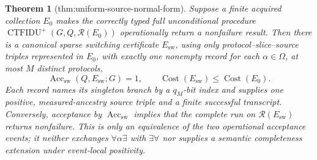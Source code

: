 \documentclass{article}
\newtheorem{theorem}{Theorem}
\begin{document}
\begin{theorem}[thm:uniform-source-normal-form]\label{thm:uniform-source-normal-form}
Suppose a finite acquired collection \(E_0\) makes the correctly typed full unconditional procedure \(\operatorname{CTFIDU}^{+}(G,Q,\mathcal R(E_0))\) operationally return a nonfailure result.  Then there is a canonical sparse switching certificate \(E_{\mathrm{sw}}\), using only protocol--slice--source triples represented in \(E_0\), with exactly one nonempty record for each \(\alpha\in\Omega\), at most \(M\) distinct protocols,
\[
 \operatorname{Acc}_{\mathrm{sw}}(Q,E_{\mathrm{sw}};G)=1,
 \qquad
 \operatorname{Cost}(E_{\mathrm{sw}})\leq\operatorname{Cost}(E_0).
\]
Each record names its singleton branch by a \(q_M\)-bit index and supplies one positive, measured-ancestry source triple and a finite successful transcript.  Conversely, acceptance by \(\operatorname{Acc}_{\mathrm{sw}}\) implies that the complete run on \(\mathcal R(E_{\mathrm{sw}})\) returns nonfailure.  This is only an equivalence of the two operational acceptance events; it neither exchanges \(\forall\alpha\exists\) with \(\exists\forall\) nor supplies a semantic completeness extension under event-local positivity.

\end{theorem}
\end{document}
